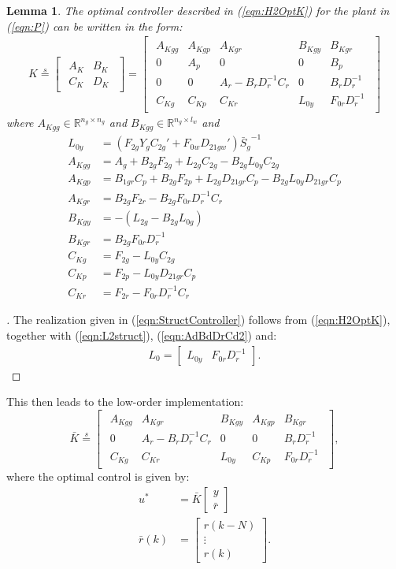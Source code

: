 \documentclass[a4paper,12pt]{article}
\newenvironment{pf}[1][\proofname]
{\begin{proof}[\proofname]}
{\end{proof}}
\newtheorem{lem}[thm]{Lemma}
\theoremstyle{remark}
\newcommand{\arr}[2]{
        \begin{array}{#1}
        #2
        \end{array}}
\newcommand{\shorteq}{\stackrel{s}{=}}
\newcommand{\ma}[1]{\begin{bmatrix} #1 \end{bmatrix}}
\newcommand{\als}[1]{\begin{align*} #1 \end{align*}}
\newcommand{\aln}[1]{\begin{align} #1 \end{align}}
\newcommand{\szo}[2]{#1\in \mathbb{R}^{#2}}
\begin{document}
\begin{lem}
The optimal controller described in (\ref{eqn:H2OptK}) for the plant in (\ref{eqn:P}) can be written in the form: 
\aln{
K \shorteq \ma{\arr{c|c}{A_K&B_K\\ \hline C_K &D_K}}
=\ma{\arr{ccc|cc}{A_{Kgg} &A_{Kgp} & A_{Kgr} & B_{Kgy}& B_{Kgr}\\
                  0&A_p&0&0&B_p\\
                  0&0&A_r-B_rD_r^{-1}C_r &0 &B_rD_r^{-1}\\\hline
                  C_{Kg}& C_{Kp}& C_{Kr}& L_{0y}&F_{0r}D_{r}^{-1}}}\label{eqn:StructController}}
where $\szo{A_{Kgg}}{n_g\times n_g}$ and $\szo{B_{Kgg}}{n_g\times l_w}$ and
\als{
L_{0y}&=(F_{2g}Y_gC_{2g}'+F_{0w}D_{21gw}'){\bar S_g}^{-1}\\
A_{Kgg}&=A_g+B_{2g}F_{2g}+L_{2g}C_{2g}-B_{2g}L_{0y}C_{2g} \\
A_{Kgp}&=B_{1gr}C_p+B_{2g}F_{2p}+L_{2g}D_{21gr}C_p-B_{2g}L_{0y}D_{21gr}C_p\\
A_{Kgr}&=B_{2g}F_{2r}-B_{2g}F_{0r}D_r^{-1}C_r\\
B_{Kgy}&=-(L_{2g}-B_{2g}L_{0g})\\
B_{Kgr}&=B_{2g}F_{0r}D_r^{-1}\\
C_{Kg}&=F_{2g}-L_{0y}C_{2g}\\
C_{Kp}&=F_{2p}-L_{0y}D_{21gr}C_p\\
C_{Kr}&=F_{2r}-F_{0r}D_r^{-1}C_r
}
\end{lem}
\begin{pf} The realization given in (\ref{eqn:StructController}) follows from (\ref{eqn:H2OptK}), together with (\ref{eqn:L2struct}),  (\ref{eqn:AdBdDrCd2}) and:
\als{L_0=\ma{L_{0y} & F_{0r}D_r^{-1}}.}
\end{pf}
%
This then leads to the low-order implementation:
\begin{equation}
\bar K \shorteq \ma{\arr{cc|ccc}{A_{Kgg}  & A_{Kgr} & B_{Kgy}& A_{Kgp} &B_{Kgr}\\
                  0&A_r-B_rD_r^{-1}C_r &0 &0&B_rD_r^{-1}\\\hline
                  C_{Kg}&  C_{Kr}& L_{0y}&C_{Kp}&F_{0r}D_{r}^{-1}}}, \label{low_order_K}
\end{equation}
where the optimal control is given by:
\als{
u^*&=\bar K \ma{y\\\bar r}\\
\bar r(k)&=\ma{r(k-N)\\\vdots\\r(k)}.
}
\end{document}
